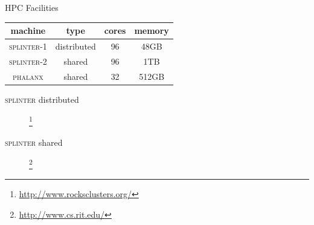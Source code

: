 \documentclass{beamer}
\begin{document}
\begin{frame}{HPC Facilities}
  \begin{table}
    \begin{tabular}{|c|c|c|c|}
      \hline
      machine & type & cores & memory  \\
      \hline
      \textsc{splinter}-1 & distributed & 96 & 48GB  \\
      \textsc{splinter}-2 & shared & 96 & 1TB \\
      \textsc{phalanx} & shared & 32 & 512GB \\
      \hline
    \end{tabular}
  \end{table}
\end{frame}

\begin{frame}{\textsc{splinter} distributed}
  \begin{figure}
    \begin{center}
      \footnote{\url{http://www.rocksclusters.org/}}
    \end{center}
  \end{figure}
\end{frame}

\begin{frame}{\textsc{splinter} shared}
  \begin{figure}
    \begin{center}
      \footnote{\url{http://www.cs.rit.edu/}}
    \end{center}
  \end{figure}
\end{frame}
\end{document}
